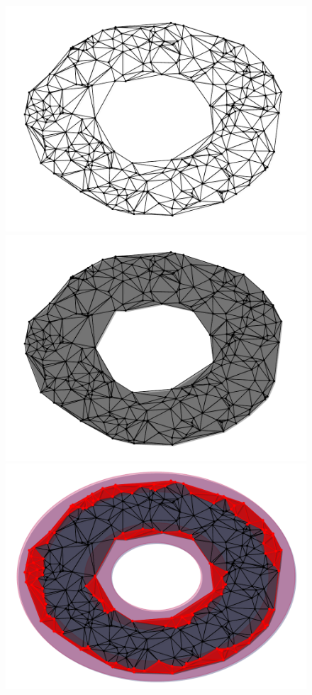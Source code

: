 \begin{figure}[htbp]
\centering
    \includegraphics[scale=0.33]{figures/boundary_graph.pdf}
    \includegraphics[scale=0.33]{figures/boundary_complex.pdf}
    \includegraphics[scale=0.33]{figures/boundary_complex_domain_fence.pdf}
     \caption{}
     \label{fig:boundary1}
 \end{figure}

